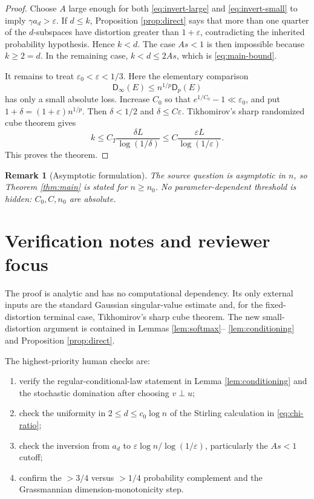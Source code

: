 \documentclass[11pt]{article}
\newtheorem{remark}[theorem]{Remark}
\newcommand{\eps}{\varepsilon}
\newcommand{\Dist}{\mathsf D}
\begin{document}
\begin{proof}
 Choose $A$ large enough for both \eqref{eq:invert-large} and
 \eqref{eq:invert-small} to imply $\gamma a_d>\eps$.  If $d\le k$,
 Proposition \ref{prop:direct} says that more than one quarter of the
 $d$-subspaces have distortion greater than $1+\eps$, contradicting the
 inherited probability hypothesis.  Hence $k<d$.  The case $As<1$ is then
 impossible because $k\ge2=d$.  In the remaining case,
 $k<d\le2As$, which is \eqref{eq:main-bound}.

It remains to treat $\eps_0<\eps<1/3$.  Here the elementary comparison
\[
       \Dist_\infty(E)\le n^{1/p}\Dist_p(E)
\]
has only a small absolute loss.  Increase $C_0$ so that
$e^{1/C_0}-1\ll\eps_0$, and put
$1+\delta=(1+\eps)n^{1/p}$.  Then $\delta<1/2$ and
$\delta\le C\eps$.  Tikhomirov's sharp randomized cube theorem
\cite{Tik14} gives
\[
 k\le C_T\frac{\delta L}{\log(1/\delta)}
 \le C\frac{\eps L}{\log(1/\eps)}.
\]
This proves the theorem.
\end{proof}

\begin{remark}[Asymptotic formulation]
The source question is asymptotic in $n$, so Theorem \ref{thm:main} is stated
for $n\ge n_0$.  No parameter-dependent threshold is hidden: $C_0,C,n_0$
are absolute.
\end{remark}

\section{Verification notes and reviewer focus}

The proof is analytic and has no computational dependency.  Its only
external inputs are the standard Gaussian singular-value estimate and, for
the fixed-distortion terminal case, Tikhomirov's sharp cube theorem.  The new
small-distortion argument is contained in Lemmas \ref{lem:softmax}--
\ref{lem:conditioning} and Proposition \ref{prop:direct}.

The highest-priority human checks are:
\begin{enumerate}[leftmargin=2em]
\item verify the regular-conditional-law statement in
Lemma \ref{lem:conditioning} and the stochastic domination after choosing
$v\perp u$;
\item check the uniformity in $2\le d\le c_0\log n$ of the Stirling
calculation in \eqref{eq:chi-ratio};
\item check the inversion from $a_d$ to
$\eps\log n/\log(1/\eps)$, particularly the $As<1$ cutoff;
\item confirm the $>3/4$ versus $>1/4$ probability complement and the
Grassmannian dimension-monotonicity step.
\end{enumerate}
\end{document}
